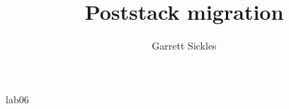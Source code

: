 
\def\thisdoc{lab06}
\def\exedirs{midpts,gom}

\author{Garrett Sickles}
\title{Poststack migration}{\thisdoc}

% 



% 

\tiny
% 
\clearpage

% 
\normalsize

